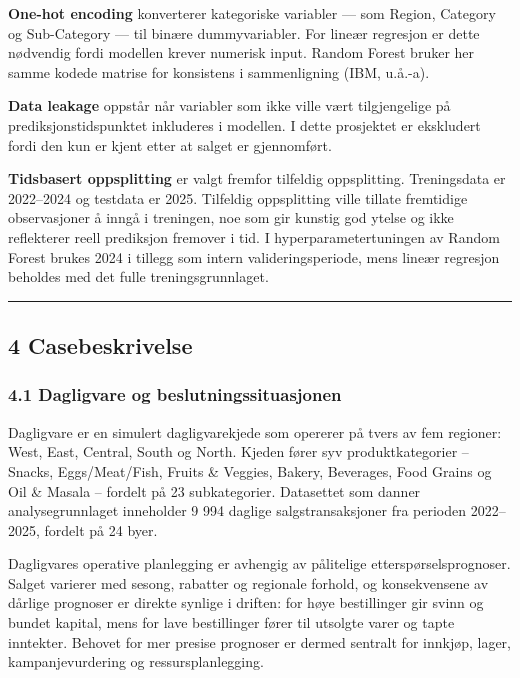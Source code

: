 \documentclass[
  11pt,
]{article}
\newcommand{\splitcode}[1]{{\ttfamily\seqsplit{#1}}}
\begin{document}
\textbf{One-hot encoding} konverterer kategoriske variabler --- som Region, Category og Sub-Category --- til binære
dummyvariabler. For lineær regresjon er dette nødvendig fordi modellen krever numerisk input. Random Forest bruker her
samme kodede matrise for konsistens i sammenligning (IBM, u.å.-a).

\textbf{Data leakage} oppstår når variabler som ikke ville vært tilgjengelige på prediksjonstidspunktet inkluderes i
modellen. I dette prosjektet er \splitcode{Profit} ekskludert fordi den kun er kjent etter at salget er gjennomført.

\textbf{Tidsbasert oppsplitting} er valgt fremfor tilfeldig oppsplitting. Treningsdata er 2022--2024 og testdata er
2025. Tilfeldig oppsplitting ville tillate fremtidige observasjoner å inngå i treningen, noe som gir kunstig god ytelse
og ikke reflekterer reell prediksjon fremover i tid. I hyperparametertuningen av Random Forest brukes 2024 i tillegg som
intern valideringsperiode, mens lineær regresjon beholdes med det fulle treningsgrunnlaget.

\begin{center}\rule{0.5\linewidth}{0.5pt}\end{center}

\hypertarget{casebeskrivelse}{%
\subsection{4 Casebeskrivelse}\label{casebeskrivelse}}

\hypertarget{dagligvare-og-beslutningssituasjonen}{%
\subsubsection{4.1 Dagligvare og beslutningssituasjonen}\label{dagligvare-og-beslutningssituasjonen}}

Dagligvare er en simulert dagligvarekjede som opererer på tvers av fem regioner: West, East, Central, South og North.
Kjeden fører syv produktkategorier -- Snacks, Eggs/Meat/Fish, Fruits \& Veggies, Bakery, Beverages, Food Grains og Oil
\& Masala -- fordelt på 23 subkategorier. Datasettet som danner analysegrunnlaget inneholder 9 994 daglige
salgstransaksjoner fra perioden 2022--2025, fordelt på 24 byer.

Dagligvares operative planlegging er avhengig av pålitelige etterspørselsprognoser. Salget varierer med sesong, rabatter
og regionale forhold, og konsekvensene av dårlige prognoser er direkte synlige i driften: for høye bestillinger gir
svinn og bundet kapital, mens for lave bestillinger fører til utsolgte varer og tapte inntekter. Behovet for mer presise
prognoser er dermed sentralt for innkjøp, lager, kampanjevurdering og ressursplanlegging.
\end{document}
